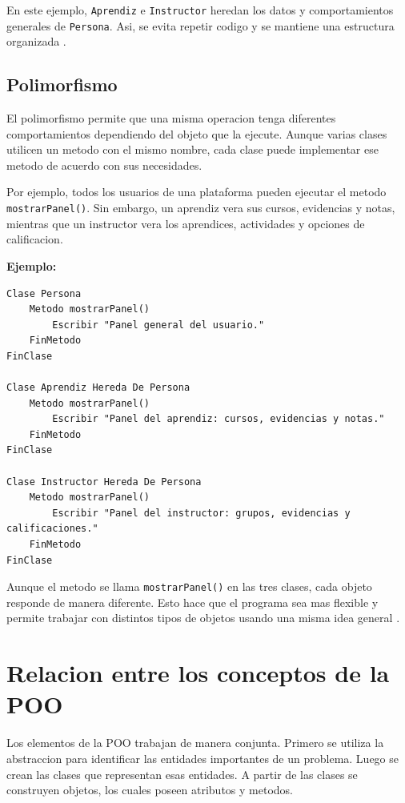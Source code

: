 \documentclass[12pt,letterpaper]{article}
\begin{document}
En este ejemplo, \texttt{Aprendiz} e \texttt{Instructor} heredan los datos y comportamientos generales de \texttt{Persona}. Asi, se evita repetir codigo y se mantiene una estructura organizada \parencite{microsoftOOP}.

\subsection{Polimorfismo}

El polimorfismo permite que una misma operacion tenga diferentes comportamientos dependiendo del objeto que la ejecute. Aunque varias clases utilicen un metodo con el mismo nombre, cada clase puede implementar ese metodo de acuerdo con sus necesidades.

Por ejemplo, todos los usuarios de una plataforma pueden ejecutar el metodo \texttt{mostrarPanel()}. Sin embargo, un aprendiz vera sus cursos, evidencias y notas, mientras que un instructor vera los aprendices, actividades y opciones de calificacion.

\textbf{Ejemplo:}

\begin{lstlisting}
Clase Persona
    Metodo mostrarPanel()
        Escribir "Panel general del usuario."
    FinMetodo
FinClase

Clase Aprendiz Hereda De Persona
    Metodo mostrarPanel()
        Escribir "Panel del aprendiz: cursos, evidencias y notas."
    FinMetodo
FinClase

Clase Instructor Hereda De Persona
    Metodo mostrarPanel()
        Escribir "Panel del instructor: grupos, evidencias y calificaciones."
    FinMetodo
FinClase
\end{lstlisting}

Aunque el metodo se llama \texttt{mostrarPanel()} en las tres clases, cada objeto responde de manera diferente. Esto hace que el programa sea mas flexible y permite trabajar con distintos tipos de objetos usando una misma idea general \parencite{microsoftOOP}.

\section{Relacion entre los conceptos de la POO}

Los elementos de la POO trabajan de manera conjunta. Primero se utiliza la abstraccion para identificar las entidades importantes de un problema. Luego se crean las clases que representan esas entidades. A partir de las clases se construyen objetos, los cuales poseen atributos y metodos.
\end{document}
